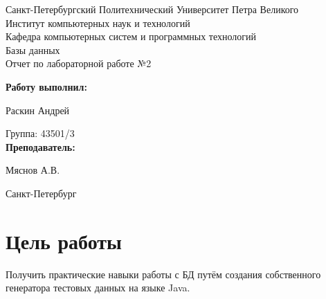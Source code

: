 \documentclass[a4paper]{article}
\begin{document}
\begin{titlepage} %

\begin{center} %

\large Санкт-Петербургский Политехнический Университет Петра Великого\\
\large Институт компьютерных наук и технологий \\
\large Кафедра компьютерных систем и программных технологий\\[6cm]

\huge Базы данных\\[0.5cm] %
\large Отчет по лабораторной работе №2\\[0.1cm]
\end{center}

\begin{flushright}
\begin{minipage}{0.5\textwidth}
\begin{flushright}
\textbf{Работу выполнил:}

Раскин Андрей

{Группа:} 43501/3\\


\textbf{Преподаватель:} 

Мяснов А.В.
\end{flushright}
\end{minipage} %
\end{flushright} %

\vfill %

\begin{center}

\large Санкт-Петербург\\
\large \the\year %

\end{center} %

\thispagestyle{empty} %
\end{titlepage} %

\vfill %

\section{Цель работы}
Получить практические навыки работы с БД путём создания собственного генератора тестовых данных на языке Java.
\end{document}

